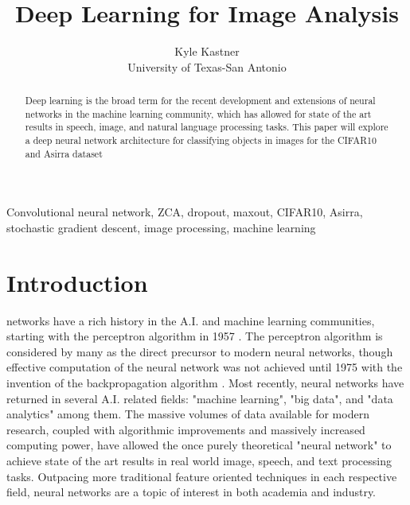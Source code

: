 \documentclass[journal]{IEEEtran}
\begin{document}
\title{Deep Learning for Image Analysis}

\author{Kyle Kastner\\University of Texas-San Antonio}

\maketitle

\begin{abstract}
Deep learning is the broad term for the recent development and extensions 
of neural networks in the machine learning community, which has allowed for
state of the art results in speech, image, and natural language processing
tasks. This paper will explore a deep neural network architecture for
classifying objects in images for the CIFAR10 and Asirra dataset 
\end{abstract}

\begin{IEEEkeywords}
Convolutional neural network, ZCA, dropout, maxout, CIFAR10, Asirra, 
stochastic gradient descent, image processing, machine learning 
\end{IEEEkeywords}

\IEEEpeerreviewmaketitle
\section{Introduction}
 networks have a rich history in the A.I. and machine
learning communities, starting with the perceptron algorithm in 1957 
\cite{Perceptron}. The perceptron algorithm is considered by many as the 
direct precursor to modern neural networks, though effective computation of the
neural network was not achieved until 1975 with the invention of the 
backpropagation algorithm \cite{Backprop}. Most recently, neural networks have
returned in several A.I. related fields: "machine learning", "big data", and 
"data analytics" among them. The massive volumes of data available for modern 
research, coupled with algorithmic improvements and massively increased 
computing power, have allowed the once purely theoretical "neural network" to
achieve state of the art results in real world image, speech, and 
text processing tasks. Outpacing more traditional feature oriented techniques 
in each respective field, neural networks are a topic of interest in both 
academia and industry.
\end{document}
